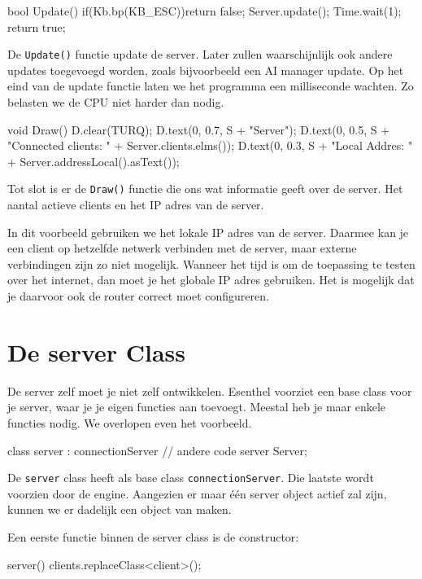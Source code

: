 \begin{code}
bool Update()
{
   if(Kb.bp(KB_ESC))return false;
   Server.update();
	 Time.wait(1);
   return true;
}
\end{code}

De \texttt{Update()} functie update de server. Later zullen waarschijnlijk ook andere updates toegevoegd worden, zoals bijvoorbeeld een AI manager update. Op het eind van de update functie laten we het programma een milliseconde wachten. Zo belasten we de CPU niet harder dan nodig.

\begin{code}
void Draw()
{
   D.clear(TURQ);
   D.text(0, 0.7, S + "Server");
   D.text(0, 0.5, S + "Connected clients: " + Server.clients.elms());
   D.text(0, 0.3, S + "Local Addres: " + Server.addressLocal().asText());
}
\end{code}

Tot slot is er de \texttt{Draw()} functie die ons wat informatie geeft over de server. Het aantal actieve clients en het IP adres van de server.

\begin{note}
In dit voorbeeld gebruiken we het lokale IP adres van de server. Daarmee kan je een client op hetzelfde netwerk verbinden met de server, maar externe verbindingen zijn zo niet mogelijk. Wanneer het tijd is om de toepassing te testen over het internet, dan moet je het globale IP adres gebruiken. Het is mogelijk dat je daarvoor ook de router correct moet configureren.
\end{note}

\section{De server Class}
De server zelf moet je niet zelf ontwikkelen. Esenthel voorziet een base class voor je server, waar je je eigen functies aan toevoegt. Meestal heb je maar enkele functies nodig. We overlopen even het voorbeeld.

\begin{code}
class server : connectionServer
{
   // andere code
}
server Server;
\end{code}

De \texttt{server} class heeft als base class \texttt{connectionServer}. Die laatste wordt voorzien door de engine. Aangezien er maar \'e\'en server object actief zal zijn, kunnen we er dadelijk een object van maken. 

Een eerste functie binnen de server class is de constructor:
\begin{code}
server() { clients.replaceClass<client>(); }
\end{code}

